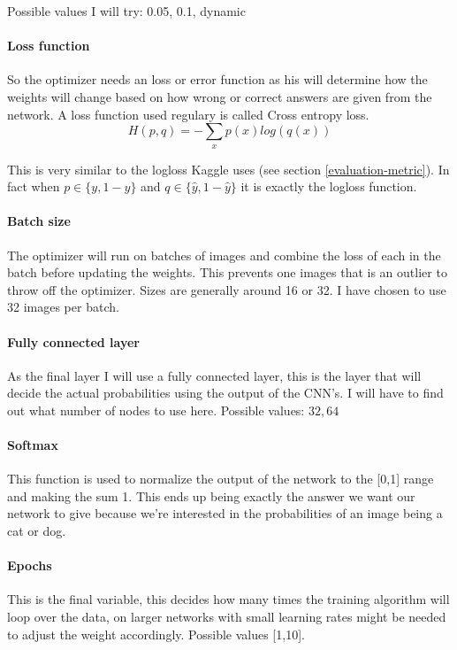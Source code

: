 \documentclass[11pt]{article}
\begin{document}
Possible values I will try: 0.05, 0.1, dynamic

\paragraph{Loss function}
So the optimizer needs an loss or error function as  his will determine how the weights will change based on how wrong or correct answers are given from the network. A loss function used regulary is called Cross entropy loss.
\[
    H(p,q) = -\sum_{x}p(x)log(q(x))
\]

This is very similar to the logloss Kaggle uses (see section \ref{evaluation-metric}). In fact when $p \in \{y, 1 - y\}$ and $q \in \{\hat{y}, 1 - \hat{y}\}$ it is exactly the logloss function. 

\paragraph{Batch size}
The optimizer will run on batches of images and combine the loss of each in the batch before updating the weights. This prevents one images that is an outlier to throw off the optimizer. Sizes are generally around 16 or 32. I have chosen to use 32 images per batch.

\paragraph{Fully connected layer}
As the final layer I will use a fully connected layer, this is the layer that will decide the actual probabilities using the output of the CNN's. I will have to find out what number of nodes to use here. Possible values: ${32, 64}$



\paragraph{Softmax}
This function is used to normalize the output of the network to the [0,1] range and making the sum 1. This ends up being exactly the answer we want our network to give because we're interested in the probabilities of an image being a cat or dog.

\paragraph{Epochs}
This is the final variable, this decides how many times the training algorithm will loop over the data, on larger networks with small learning rates might be needed to adjust the weight accordingly. Possible values [1,10].
\end{document}
